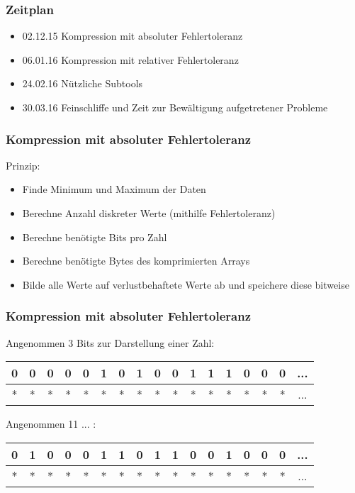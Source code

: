 \documentclass[compress]{beamer}
\begin{document}
\begin{frame}
	\frametitle{Zeitplan}

	\begin{itemize}[<+->]
		\item<1-5> 02.12.15 Kompression mit absoluter Fehlertoleranz
		\item<2-4> 06.01.16 Kompression mit relativer Fehlertoleranz
		\item<3-4> 24.02.16 Nützliche Subtools
		\item<4> 30.03.16 Feinschliffe und Zeit zur Bewältigung aufgetretener Probleme
	\end{itemize}
\end{frame}

\begin{frame}
	\frametitle{Kompression mit absoluter Fehlertoleranz}

	Prinzip:

	\begin{itemize}[<+->]
		\pause
		\item Finde Minimum und Maximum der Daten
		\item Berechne Anzahl diskreter Werte (mithilfe Fehlertoleranz)
		\item Berechne benötigte Bits pro Zahl
		\item Berechne benötigte Bytes des komprimierten Arrays
		\item Bilde alle Werte auf verlustbehaftete Werte ab und speichere diese bitweise
	\end{itemize}
\end{frame}

\begin{frame}
	\frametitle{Kompression mit absoluter Fehlertoleranz}

	Angenommen 3 Bits zur Darstellung einer Zahl:
	\bigskip\mbox{}
	\pause

	\begin{tabular}{|ccccccccccccccccc}
		\hline
		0 & 0 & \multicolumn{1}{c|}{0} & 0 & 0 & \multicolumn{1}{c|}{1} & 0 & 1 & \multicolumn{1}{c|}{0} & 0 & 1 & \multicolumn{1}{c|}{1} & 1 & 0 & \multicolumn{1}{c|}{0} & 0 & ... \\ \hline
		\hline
		* & * & * & * & * & * & * & \multicolumn{1}{c|}{*} & * & * & * & * & * & * & * & \multicolumn{1}{c|}{*} & ... \\ \hline
	\end{tabular}
	\bigskip\bigskip\mbox{}
	\pause 

	Angenommen 11 ... :
	\bigskip\mbox{}
	\pause

	\begin{tabular}{|ccccccccccccccccc}
		\hline
		0 & 1 & 0 & 0 & 0 & 1 & 1 & 0 & 1 & 1 & \multicolumn{1}{c|}{0} & 0 & 1 & 0 & 0 & 0 & ... \\ \hline
		\hline
		* & * & * & * & * & * & * & \multicolumn{1}{c|}{*} & * & * & * & * & * & * & * & \multicolumn{1}{c|}{*} & ... \\ \hline
	\end{tabular}

\end{frame}
\end{document}

